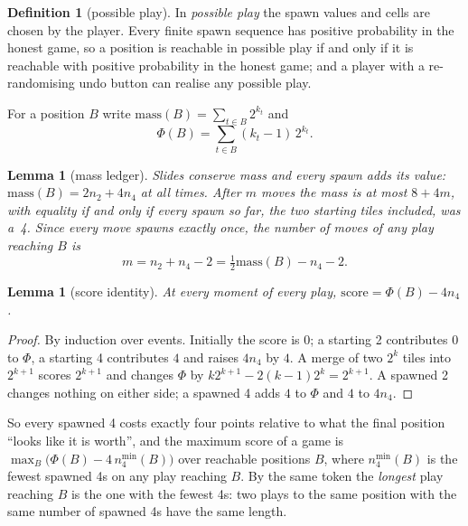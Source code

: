 \documentclass[11pt]{article}
\newtheorem{lemma}[theorem]{Lemma}
\theoremstyle{definition}
\newtheorem{definition}[theorem]{Definition}
\theoremstyle{remark}
\newcommand{\Phichain}{\Phi}
\newcommand{\nfour}{n_4}
\newcommand{\ntwo}{n_2}
\newcommand{\mass}{\mathrm{mass}}
\begin{document}
\begin{definition}[possible play]
In \emph{possible play} the spawn values and cells are chosen by the
player. Every finite spawn sequence has positive probability in the honest
game, so a position is reachable in possible play if and only if it is
reachable with positive probability in the honest game; and a player with
a re-randomising undo button can realise any possible play.
\end{definition}

For a position $B$ write $\mass(B)=\sum_{t\in B}2^{k_t}$ and
\[
\Phichain(B)=\sum_{t\in B}(k_t-1)\,2^{k_t}.
\]

\begin{lemma}[mass ledger]\label{lem:mass}
Slides conserve mass and every spawn adds its value:
$\mass(B)=2\ntwo+4\nfour$ at all times. After $m$ moves the mass is at
most $8+4m$, with equality if and only if every spawn so far, the two
starting tiles included, was a~4. Since every move spawns exactly once,
the number of moves of any play reaching $B$ is
\[
m=\ntwo+\nfour-2=\tfrac12\mass(B)-\nfour-2 .
\]
\end{lemma}

\begin{lemma}[score identity]\label{lem:score}
At every moment of every play, $\mathrm{score}=\Phichain(B)-4\nfour$.
\end{lemma}
\begin{proof}
By induction over events. Initially the score is $0$; a starting 2
contributes $0$ to $\Phichain$, a starting 4 contributes $4$ and raises
$4\nfour$ by $4$. A merge of two $2^k$ tiles into $2^{k+1}$ scores
$2^{k+1}$ and changes $\Phichain$ by $k2^{k+1}-2(k-1)2^k=2^{k+1}$. A spawned
2 changes nothing on either side; a spawned 4 adds $4$ to $\Phichain$ and
$4$ to $4\nfour$.
\end{proof}

So every spawned 4 costs exactly four points relative to what the final
position ``looks like it is worth'', and the maximum score of a game is
$\max_B\bigl(\Phichain(B)-4\,\nfour^{\min}(B)\bigr)$ over reachable
positions $B$, where $\nfour^{\min}(B)$ is the fewest spawned 4s on any play
reaching $B$. By the same token the \emph{longest} play reaching $B$ is
the one with the fewest 4s: two plays to the same position with the same
number of spawned 4s have the same length.
\end{document}
